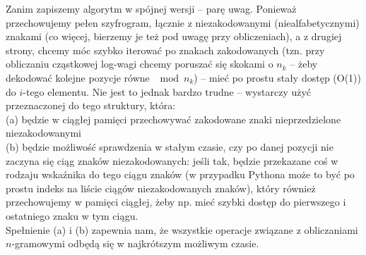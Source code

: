 \documentclass[a4paper]{article}
\theoremstyle{defn}
\theoremstyle{theorem}
\theoremstyle{lemma}
\theoremstyle{cor}
\theoremstyle{fact}
\begin{document}
Zanim zapiszemy algorytm w spójnej wersji – parę uwag. Ponieważ przechowujemy pełen szyfrogram, łącznie z niezakodowanymi (niealfabetycznymi) znakami (co więcej, bierzemy je też pod uwagę przy obliczeniach), a z drugiej strony, chcemy móc szybko iterować po znakach zakodowanych (tzn. przy obliczaniu cząstkowej log-wagi chcemy poruszać się skokami o $n_k$ – żeby dekodować kolejne pozycje równe $\mod n_k$) – mieć po prostu stały dostęp (O(1)) do $i$-tego elementu. Nie jest to jednak bardzo trudne – wystarczy użyć przeznaczonej do tego struktury, która:\\
(a) będzie w ciągłej pamięci przechowywać zakodowane znaki nieprzedzielone niezakodowanymi\\
(b) będzie możliwość sprawdzenia w stałym czasie, czy po danej pozycji nie zaczyna się ciąg znaków niezakodowanych: jeśli tak, będzie przekazane coś w rodzaju wskaźnika do tego ciągu znaków (w przypadku Pythona może to być po prostu indeks na liście ciągów niezakodowanych znaków), który również przechowujemy w pamięci ciągłej, żeby np. mieć szybki dostęp do pierwszego i ostatniego znaku w tym ciągu.\\

Spełnienie (a) i (b) zapewnia nam, że wszystkie operacje związane z obliczaniami $n$-gramowymi odbędą się w najkrótszym możliwym czasie.\\
\end{document}
